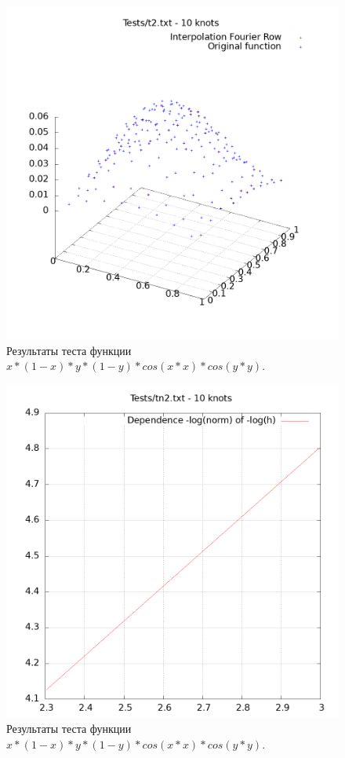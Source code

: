 \documentclass[14pt,a4paper]{extarticle}
\newcommand{\1}{\mathbbm{1}}
\begin{document}
    \begin{figure}
        \centering
        \includegraphics[scale=0.5]{Images/t2.txt.png}
        \caption{Результаты теста функции $x * (1 - x) * y * (1 - y) * cos(x * x) * cos(y * y)$.}
    \end{figure}

\begin{figure}
    \centering
    \includegraphics[scale=0.5]{Images/tn2.txt.png}
    \caption{Результаты теста функции $x * (1 - x) * y * (1 - y) * cos(x * x) * cos(y * y)$.}
\end{figure}
\end{document}
